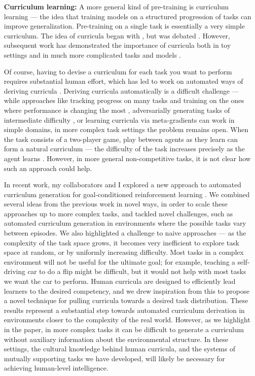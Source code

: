 \textbf{Curriculum learning:} A more general kind of pre-training is curriculum learning \citep{Bengio2009} --- the idea that training models on a structured progression of tasks can improve generalization. Pre-training on a single task is essentially a very simple curriculum. The idea of curricula began with \citet{Elman1993}, but was debated \citep[e.g.][]{Rohde1997}. However, subsequent work has demonstrated the importance of curricula both in toy settings \citep{Gulcehre2013} and in much more complicated tasks and models \citep[e.g.][]{Zaremba2014, Graves2016}. \par
Of course, having to devise a curriculum for each task you want to perform requires substantial human effort, which has led to work on automated ways of deriving curricula \citep{Graves2017}. Deriving curricula automatically is a difficult challenge --- while approaches like tracking progress on many tasks and training on the ones where performance is changing the most \citep{Baranes2013}, adversarially generating tasks of intermediate difficulty \citep{Florensa2018}, or learning curricula via meta-gradients \citep{Such2019} can work in simple domains, in more complex task settings the problem remains open. When the task consists of a two-player game, play between agents as they learn can form a natural curriculum --- the difficulty of the task increases precisely as the agent learns \citep{Silver2017, Jaderberg2019}. However, in more general non-competitive tasks, it is not clear how such an approach could help. \par 
In recent work, my collaborators and I explored a new approach to automated curriculum generation for goal-conditioned reinforcement learning \citep{Racaniere2019}. We combined several ideas from the previous work in novel ways, in order to scale these approaches up to more complex tasks, and tackled novel challenges, such as automated curriculum generation in environments where the possible tasks vary between episodes. We also highlighted a challenge to naive approaches --- as the complexity of the task space grows, it becomes very inefficient to explore task space at random, or by uniformly increasing difficulty. Most tasks in a complex environment will not be useful for the ultimate goal; for example, teaching a self-driving car to do a flip might be difficult, but it would not help with most tasks we want the car to perform. Human curricula are designed to efficiently lead learners to the desired competency, and we drew inspiration from this to propose a novel technique for pulling curricula towards a desired task distribution. These results represent a substantial step towards automated curriculum derivation in environments closer to the complexity of the real world. However, as we highlight in the paper, in more complex tasks it can be difficult to generate a curriculum without auxiliary information about the environmental structure. In these settings, the cultural knowledge behind human curricula, and the systems of mutually supporting tasks we have developed, will likely be necessary for achieving human-level intelligence. \par 

